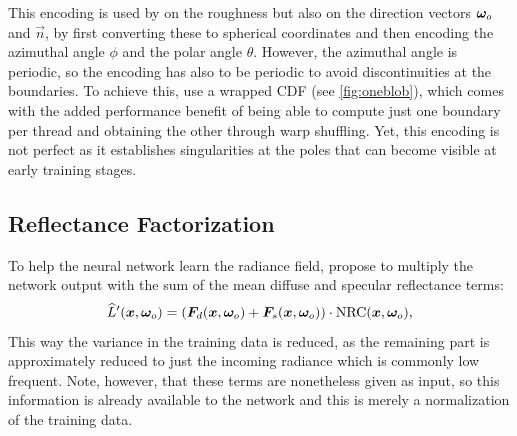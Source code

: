 This encoding is used by \textcite{muller2021} on the roughness but also on the direction vectors ${\bm{\omega}_o}$ and $\vec{n}$, by first converting these to spherical coordinates and then encoding the azimuthal angle $\phi$ and the polar angle $\theta$.
However, the azimuthal angle is periodic, so the encoding has also to be periodic to avoid discontinuities at the boundaries.
To achieve this, \textcite{muller2021} use a wrapped CDF (see \cref{fig:oneblob}), which comes with the added performance benefit of being able to compute just one boundary per thread and obtaining the other through warp shuffling.
Yet, this encoding is not perfect as it establishes singularities at the poles that can become visible at early training stages.




\subsection{Reflectance Factorization}
To help the neural network learn the radiance field, \textcite{muller2021} propose to multiply the network output with the sum of the mean diffuse and specular reflectance terms:
\begin{equation}
    \widehat{L}'(\vec{x}, \wo) = \left( \vec{F}_d(\vec{x}, \wo) + \vec{F}_s(\vec{x}, \wo) \right) \cdot \mathrm{NRC}(\vec{x}, \wo),
\end{equation}
This way the variance in the training data is reduced, as the remaining part is approximately reduced to just the incoming radiance which is commonly low frequent.
Note, however, that these terms are nonetheless given as input, so this information is already available to the network and this is merely a normalization of the training data.

